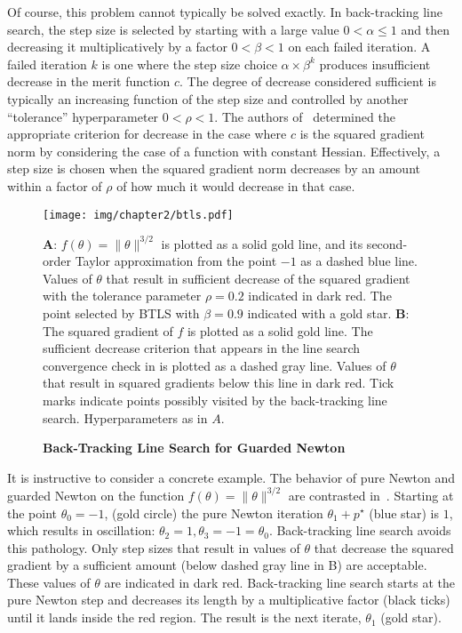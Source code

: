 \documentclass[../../thesis.tex]{subfiles}
\begin{document}
Of course, this problem cannot typically be solved exactly.
In back-tracking line search,
the step size is selected by starting with a large value
$0 < \alpha \leq 1$
and then decreasing it multiplicatively by a factor $0 < \beta < 1$
on each failed iteration.
A failed iteration $k$ is one where the step size choice
$\alpha \times \beta^k$
produces insufficient decrease in the merit function $c$.
The degree of decrease considered sufficient
is typically an increasing function of the step size
and controlled by another \enquote{tolerance} hyperparameter
$0 < \rho < 1$.
The authors of~\cite{roosta2018}
determined the appropriate criterion for decrease
in the case where $c$ is the squared gradient norm
by considering the case of a function with constant Hessian.
Effectively, a step size is chosen
when the squared gradient norm decreases by an amount within
a factor of $\rho$ of how much it would decrease
in that case.

\begin{figure}[Hp!]
	\begin{center}
		\texttt{[image: img/chapter2/btls.pdf]}
	\end{center}
	\caption{\textbf{Back-Tracking Line Search
	for Guarded Newton}}{%
	\textbf{A}:
	$f(\theta) = \|\theta\|^{3/2}$
	is plotted as a solid gold line,
	and its second-order Taylor approximation
	from the point $-1$ as a dashed blue line.
	Values of $\theta$ that result in
	sufficient decrease of the squared gradient
	with the tolerance parameter $\rho=0.2$
	indicated in dark red.
	The point selected by BTLS
	with $\beta=0.9$ indicated with a gold star.
	\textbf{B}:
	The squared gradient of $f$ is plotted as a
	solid gold line.
	The sufficient decrease criterion that appears
	in the line search convergence check in 
	is plotted as a dashed gray line.
	Values of $\theta$ that result in squared gradients
	below this line in dark red.
	Tick marks indicate points possibly visited
	by the back-tracking line search.
	Hyperparameters as in $A$.
	}
\end{figure}

It is instructive to consider a concrete example.
The behavior of pure Newton and
guarded Newton on the function
$f(\theta) = \|\theta\|^{3/2}$
are contrasted in~.
Starting at the point $\theta_0=-1$,
(gold circle)
the pure Newton iteration $\theta_1 + p^\star$
(blue star)
is $1$, which results in oscillation:
$\theta_2=1, \theta_3=-1=\theta_0$.
Back-tracking line search avoids this pathology.
Only step sizes that result in values of $\theta$
that decrease the squared gradient by a sufficient amount
(below dashed gray line in B)
are acceptable.
These values of $\theta$ are indicated in dark red.
Back-tracking line search starts at the pure Newton step
and decreases its length by a multiplicative factor
(black ticks)
until it lands inside the red region.
The result is the next iterate,
$\theta_1$ (gold star).
\end{document}
